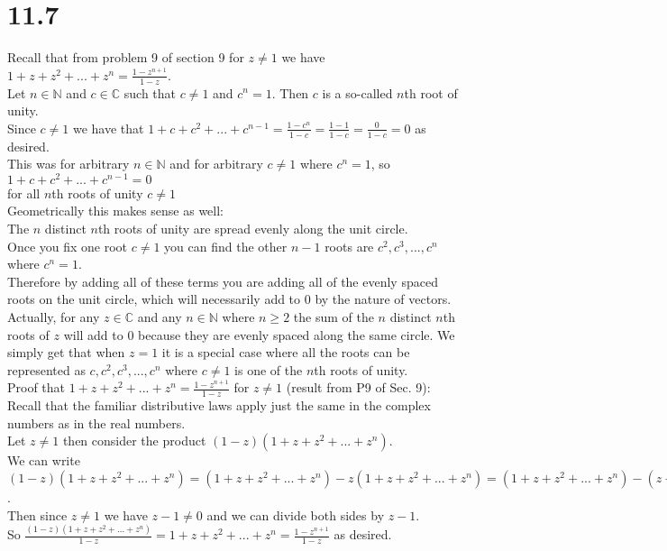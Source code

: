 \documentclass{article}
\begin{document}
\section*{11.7}
\begin{center}
    \doublespacing
    Recall that from problem 9 of section 9 for $z\neq 1$ we have $1 + z + z^2 + ... + z^n =\frac{1 - z^{n+1}}{1 - z}$.
    \\Let $n\in\mathbb{N}$ and $c\in\mathbb{C}$ such that $c\neq 1$ and $c^n = 1$. Then $c$ is a so-called $n$th root of unity.
    \\Since $c\neq 1$ we have that $1 + c + c^2 + ... + c^{n-1} =\frac{1 - c^n}{1 - c} =\frac{1 - 1}{1 - c} =\frac{0}{1 - c} = 0$ as desired.
    \\This was for arbitrary $n\in\mathbb{N}$ and for arbitrary $c\neq 1$ where $c^n = 1$, so $1 + c + c^2 + ... + c^{n-1} = 0$
    \\for all $n$th roots of unity $c\neq 1$ \qedsymbol
    \break
    \\Geometrically this makes sense as well:
    \\The $n$ distinct $n$th roots of unity are spread evenly along the unit circle.
    \\Once you fix one root $c\neq 1$ you can find the other $n-1$ roots are $c^2, c^3, ..., c^n$ where $c^n = 1$.
    \\Therefore by adding all of these terms you are adding all of the evenly spaced roots on the unit circle, which will necessarily add to 0 by the nature of vectors.
    \\Actually, for any $z\in\mathbb{C}$ and any $n\in\mathbb{N}$ where $n\geq 2$ the sum of the $n$ distinct $n$th roots of $z$ will add to 0 because they are evenly spaced along the same circle. We simply get that when $z = 1$ it is a special case where all the roots can be represented as $c, c^2, c^3, ..., c^n$ where $c\neq 1$ is one of the $n$th roots of unity.
    \break
    \\Proof that $1 + z + z^2 + ... + z^n =\frac{1 - z^{n+1}}{1 - z}$ for $z\neq 1$ (result from P9 of Sec. 9):
    \\Recall that the familiar distributive laws apply just the same in the complex numbers as in the real numbers.
    \\Let $z\neq 1$ then consider the product $(1 - z)(1 + z + z^2 + ... + z^n)$.
    \\We can write $(1 - z)(1 + z + z^2 + ... + z^n) = (1 + z + z^2 + ... + z^n) - z(1 + z + z^2 + ... + z^n) = (1 + z + z^2 + ... + z^n) - (z + z z + z z^2 + ... + z z^n) = (1 + z + z^2 + ... + z^n) - (z + z^2 + z^3 + ... + z^{n+1}) = 1 + z + z^2 + ... + z^n - z - z^2 - z^3 + ... - z^{n+1} = 1 + (z - z) + (z^2 - z^2) + ... + (z^n - z^n) - z^{n+1} = 1 - z^{n+1}$.
    \\Then since $z\neq 1$ we have $z - 1\neq 0$ and we can divide both sides by $z - 1$.
    \\So $\frac{(1 - z)(1 + z + z^2 + ... + z^n)}{1 - z} = 1 + z + z^2 + ... + z^n =\frac{1 - z^{n+1}}{1 - z}$ as desired.
\end{center}
\end{document}
